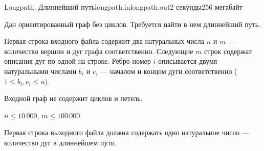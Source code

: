 \begin{problem}{Longpath. Длиннейший путь}{longpath.in}{longpath.out}{2 секунды}{256 мегабайт}

Дан ориентированный граф без циклов. Требуется найти в нем длиннейший путь.

\InputFile

Первая строка входного файла содержит два натуральных числа $n$ и $m$ --- 
количество вершин и дуг графа соответственно. Следующие $m$ строк содержат 
описания дуг по одной на строке. Ребро номер $i$ описывается двумя 
натуральными числами $b_i$ и $e_i$ --- началом и концом дуги соответственно 
($1 \le b_i, e_i \le n$).

Входной граф не содержит циклов и петель.

$n \le 10\,000$, $m \le 100\,000$.

\OutputFile

Первая строка выходного файла должна содержать одно натуральное число --- 
количество дуг в длиннейшем пути.

\Example

\begin{example}
%
\end{example}

\end{problem}
